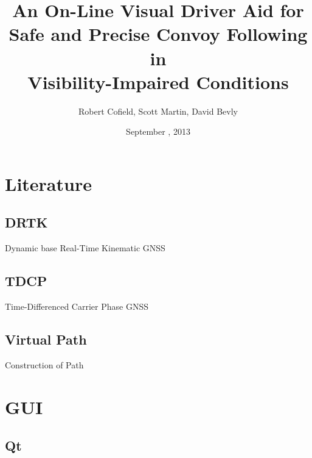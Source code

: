 \documentclass{beamer}
\title[DRTK Driver Assistance]{An On-Line Visual Driver Aid for\\ Safe and Precise Convoy Following in\\ Visibility-Impaired Conditions}
\author[]{Robert Cofield, Scott Martin, David Bevly}
\date{September , 2013}
\begin{document}
\frame{\titlepage}

\section{Literature}

  \subsection{DRTK}

    \begin{frame}{Dynamic base Real-Time Kinematic GNSS}
    \end{frame}


  \subsection{TDCP}

    \begin{frame}{Time-Differenced Carrier Phase GNSS}
    \end{frame}


  \subsection{Virtual Path}

    \begin{frame}{Construction of Path}
    \end{frame}


\section{GUI}

  \subsection{Qt}
\end{document}
